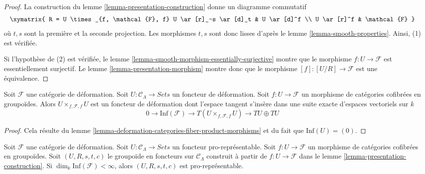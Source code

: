 \begin{proof}
La construction du lemme \ref{lemma-presentation-construction} donne un
diagramme commutatif
$$
\xymatrix{
R = U \times_{f, \mathcal{F}, f} U \ar[r]_-s \ar[d]_t & U
\ar[d]^f \\
U \ar[r]^f & \mathcal{F}
}
$$
où $t, s$ sont la première et la seconde projection. Les morphismes $t, s$
sont donc lisses d'après le lemme \ref{lemma-smooth-properties}. Ainsi, (1)
est vérifiée.

\medskip\noindent
Si l'hypothèse de (2) est vérifiée, le lemme
\ref{lemma-smooth-morphism-essentially-surjective} montre que le morphisme
$f : U \to \mathcal{F}$ est essentiellement surjectif. Le lemme
\ref{lemma-presentation-morphism} montre donc que le morphisme
$[f] : [U/R] \to \mathcal{F}$ est une équivalence.
\end{proof}

\begin{lemma}
\label{lemma-deformation-functor-diagonal}
Soit $\mathcal{F}$ une catégorie de déformation. Soit
$U : \mathcal{C}_\Lambda \to \textit{Sets}$ un foncteur de déformation. Soit
$f: U \to \mathcal{F}$ un morphisme de catégories cofibrées en groupoïdes.
Alors $U \times_{f, \mathcal{F}, f} U$ est un foncteur de déformation dont
l'espace tangent s'insère dans une suite exacte d'espaces vectoriels sur $k$
$$
0 \to \text{Inf}(\mathcal{F}) \to
T(U \times_{f, \mathcal{F}, f} U) \to TU \oplus TU
$$
\end{lemma}

\begin{proof}
Cela résulte du lemme
\ref{lemma-deformation-categories-fiber-product-morphisms} et du fait que
$\text{Inf}(U) = (0)$.
\end{proof}

\begin{lemma}
\label{lemma-prorepresentable-groupoid-in-functors-construction}
Soit $\mathcal{F}$ une catégorie de déformation. Soit
$U : \mathcal{C}_\Lambda \to \textit{Sets}$ un foncteur pro-représentable.
Soit $f : U \to \mathcal{F}$ un morphisme de catégories cofibrées en
groupoïdes. Soit $(U, R, s, t, c)$ le groupoïde en foncteurs sur
$\mathcal{C}_\Lambda$ construit à partir de $f : U \to \mathcal{F}$ dans le
lemme \ref{lemma-presentation-construction}. Si
$\dim_k \text{Inf}(\mathcal{F}) < \infty$, alors $(U, R, s, t, c)$ est
pro-représentable.
\end{lemma}

